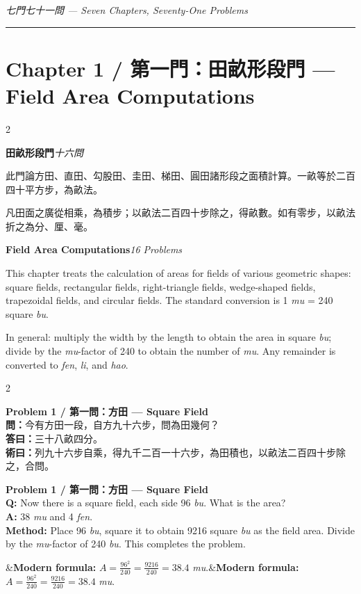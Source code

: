 \documentclass[11pt,a4paper]{article}
\newcommand{\bilingualproblem}[4]{%
  \begin{paracol}{2}
  \begin{leftcolumn}
  \noindent\textbf{\color{problemcolor}#1}\\[0.2cm]
  #2
  \end{leftcolumn}
  \switchcolumn
  \noindent\textbf{\color{problemcolor}#1}\\[0.2cm]
  #3
  \end{paracol}
  \ifx&#4&\else\vspace{0.3cm}\noindent#4\fi
  \vspace{0.5cm}
}
\newcommand{\wen}[1]{\textcolor{problemcolor}{\textbf{問：}}#1}
\newcommand{\da}[1]{\textcolor{answercolor}{\textbf{答曰：}}#1}
\newcommand{\shu}[1]{\textcolor{methodcolor}{\textbf{術曰：}}#1}
\newcommand{\wenen}[1]{\textcolor{problemcolor}{\textbf{Q:}} #1}
\newcommand{\daen}[1]{\textcolor{answercolor}{\textbf{A:}} #1}
\newcommand{\shuen}[1]{\textcolor{methodcolor}{\textbf{Method:}} #1}
\begin{document}
\begin{center}
\textit{七門七十一問 --- Seven Chapters, Seventy-One Problems}
\end{center}

\vspace{0.5cm}
\noindent\rule{\textwidth}{1pt}
\vspace{0.3cm}

\section{Chapter 1 / 第一門：田畝形段門 --- Field Area Computations}
\label{sec:tianmu}

\begin{paracol}{2}
\begin{leftcolumn}
\noindent\textbf{田畝形段門}\quad\textit{十六問}

此門論方田、直田、勾股田、圭田、梯田、圓田諸形段之面積計算。一畝等於二百四十平方步，為畝法。

凡田面之廣從相乘，為積步；以畝法二百四十步除之，得畝數。如有零步，以畝法折之為分、厘、毫。
\end{leftcolumn}

\switchcolumn

\noindent\textbf{Field Area Computations}\quad\textit{16 Problems}

This chapter treats the calculation of areas for fields of various geometric shapes: square fields, rectangular fields, right-triangle fields, wedge-shaped fields, trapezoidal fields, and circular fields. The standard conversion is 1 \textit{mu} = 240 square \textit{bu}.

In general: multiply the width by the length to obtain the area in square \textit{bu}; divide by the \textit{mu}-factor of 240 to obtain the number of \textit{mu}. Any remainder is converted to \textit{fen}, \textit{li}, and \textit{hao}.
\end{paracol}

\vspace{0.5cm}

\bilingualproblem{Problem 1 / 第一問：方田 --- Square Field}{
\wen{今有方田一段，自方九十六步，問為田幾何？}\\[0.2cm]
\da{三十八畝四分。}\\[0.2cm]
\shu{列九十六步自乘，得九千二百一十六步，為田積也，以畝法二百四十步除之，合問。}
}{
\wenen{Now there is a square field, each side 96 \textit{bu}. What is the area?}\\[0.2cm]
\daen{38 \textit{mu} and 4 \textit{fen}.}\\[0.2cm]
\shuen{Place 96 \textit{bu}, square it to obtain 9216 square \textit{bu} as the field area. Divide by the \textit{mu}-factor of 240 \textit{bu}. This completes the problem.}
}{\textbf{Modern formula:} $A = \frac{96^2}{240} = \frac{9216}{240} = 38.4$ \textit{mu}.}
\end{document}
